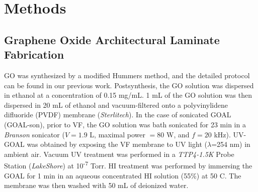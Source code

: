 \section{Methods}

\subsection{Graphene Oxide Architectural Laminate Fabrication}
GO was synthesized by a modified Hummers method, and the detailed protocol can be found in our previous work.\cite{amadei2016fabrication} Postsynthesis, the GO solution was dispersed in ethanol at a concentration of 0.15 mg/mL. 1 mL of the GO solution was then dispersed in 20 mL of ethanol and vacuum-filtered onto a polyvinylidene difluoride (PVDF) membrane (\textit{Sterlitech}). In the case of sonicated GOAL (GOAL-son), prior to VF, the GO solution was bath sonicated for 23 min in a \textit{Branson} sonicator ($V=1.9$ L, maximal power $=80$ W, and $f=20$ kHz). UV-GOAL was obtained by exposing the VF membrane to UV light ($\lambda$=254 nm) in ambient air. Vacuum UV treatment was performed in a \textit{TTP4-1.5K} Probe Station (\textit{LakeShore}) at 10\textsuperscript{-7} Torr. HI treatment was performed by immersing the GOAL for 1 min in an aqueous concentrated HI solution (55\%) at 50 \textdegree C. The membrane was then washed with 50 mL of deionized water.

